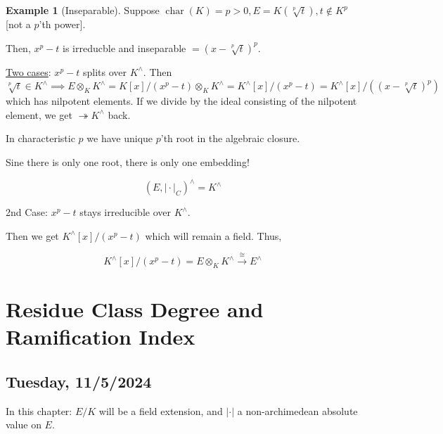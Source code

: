 \documentclass[openany]{amsbook}
\numberwithin{section}{chapter}
\theoremstyle{definition}
\newtheorem*{example}{Example}
\begin{document}
\begin{example}
    [Inseparable] Suppose \(\operatorname{char}(K) = p > 0, E = K(\sqrt[p]{t}), t \notin K^p\) [not a \(p\)'th power].
    
    Then, \(x^p - t\) is irreducble and inseparable \(= (x - \sqrt[p]{t})^p\).
    
    \underline{Two cases}: \(x^p - t\) splits over \(K^\wedge\). Then \(\sqrt[p]{t} \in K^\wedge \implies E \otimes_K K^\wedge = K[x] / (x^p - t) \otimes_K K^\wedge = K^\wedge [x] / (x^p - t) = K^\wedge [x] / ((x - \sqrt[p]{t})^p)\) which has nilpotent elements. If we divide by the ideal consisting of the nilpotent element, we get \(\twoheadrightarrow K^\wedge\) back.

    In characteristic \(p\) we have unique \(p\)'th root in the algebraic closure.

    \begin{center}
    \end{center}

    Sine there is only one root, there is only one embedding!

    \[
        (E, \vert \cdot \vert_C)^\wedge = K^\wedge
    \]

    2nd Case: \(x^p - t\) stays irreducible over \(K^\wedge\).

    Then we get \(K^\wedge[x] / (x^p -t)\) which will remain a field. Thus,
    
    \[
        K^\wedge[x] / (x^p - t) = E \otimes_K K^{\wedge} \overset{\cong}{\to} E^\wedge 
    \]
\end{example}

\chapter{Residue Class Degree and Ramification Index}

\section*{Tuesday, 11/5/2024}

In this chapter: \(E / K\) will be a field extension, and \(\vert \cdot \vert \) a non-archimedean absolute value on \(E\).
\end{document}

